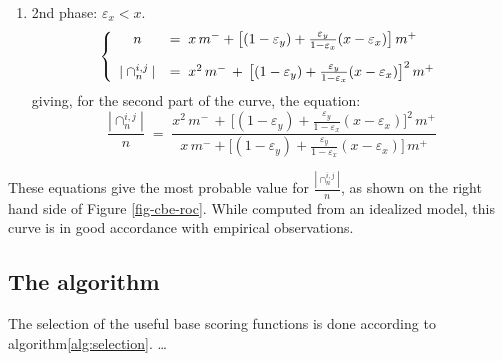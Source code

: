 \documentclass[twocolumn,english]{article}
\begin{document}
\begin{enumerate}
   \item 2nd phase: $\varepsilon_x < x$. 
   \begin{equation}
   \left\lbrace
      \begin{array}{cl}
      \vspace{0.3cm}
   n &= \; x \, m^{-} + \bigl[(1 - \varepsilon_y) + \frac{\varepsilon_y}{1 - \varepsilon_x} (x - \varepsilon_x) \bigr] \, m^{+} \\
   |\cap_n^{i,j}| &= \; x^2 \, m^{-} \, + \, \bigl[({1 - \varepsilon_y}) + \frac{\varepsilon_y}{1 - \varepsilon_x} (x - \varepsilon_x) \bigr]^2 \,  m^{+}
      \end{array}
   \right.
   \end{equation}
   giving, for the second part of the curve, the equation:
   \begin{equation}
   \frac{|\cap_n^{i,j}|}{n} \; = \; \frac{x^2 \, m^{-} \, + \, \bigl[({1 - \varepsilon_y}) + \frac{\varepsilon_y}{1 - \varepsilon_x} (x - \varepsilon_x) \bigr]^2 \,  m^{+}}
   {x \, m^{-} + \bigl[(1 - \varepsilon_y) + \frac{\varepsilon_y}{1 - \varepsilon_x} (x - \varepsilon_x) \bigr] \, m^{+}}
   \end{equation}
   
\end{enumerate}

These equations give the most probable value for $\frac{|\cap_n^{i,j}|}{n}$, as shown on the right hand side of Figure \ref{fig-cbe-roc}. While computed from an idealized model, this curve is in good accordance with empirical observations. 




\subsection{The algorithm}

The selection of the useful base scoring functions is done according to algorithm\ref{alg:selection}. \ldots 
\end{document}
